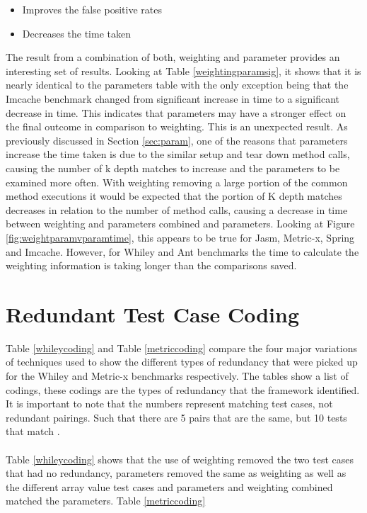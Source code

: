 \begin{itemize}
\item Improves the false positive rates
\item Decreases the time taken
\end{itemize}

The result from a combination of both, weighting and parameter provides an interesting set of results. Looking at Table \ref{weightingparamsig}, it shows that it is nearly identical to the parameters table with the only exception being that the Imcache benchmark changed from significant increase in time to a significant decrease in time. This indicates that parameters may have a stronger effect on the final outcome in comparison to weighting. This is an unexpected result. As previously discussed in Section \ref{sec:param}, one of the reasons that parameters increase the time taken is due to the similar setup and tear down method calls, causing the number of k depth matches to increase and the parameters to be examined more often. With weighting removing a large portion of the common method executions it would be expected that the portion of K depth matches decreases in relation to the number of method calls, causing a decrease in time between weighting and parameters combined and parameters. Looking at Figure \ref{fig:weightparamvparamtime}, this appears to be true for Jasm, Metric-x, Spring and Imcache. However, for Whiley and Ant benchmarks the time to calculate the weighting information is taking longer than the comparisons saved. 



\section{Redundant Test Case Coding}

Table \ref{whileycoding} and Table \ref{metriccoding} compare the four major variations of techniques used to show the different types of redundancy that were picked up for the Whiley and Metric-x benchmarks respectively. The tables show a list of codings, these codings are the types of redundancy that the framework identified. It is important to note that the numbers represent matching test cases, not redundant pairings. Such that there are 5 pairs that are the same, but 10 tests that match .
\paragraph{}
Table \ref{whileycoding} shows that the use of weighting removed the two test cases that had no redundancy, parameters removed the same as weighting as well as the different array value test cases and parameters and weighting combined matched the parameters. Table \ref{metriccoding} 

